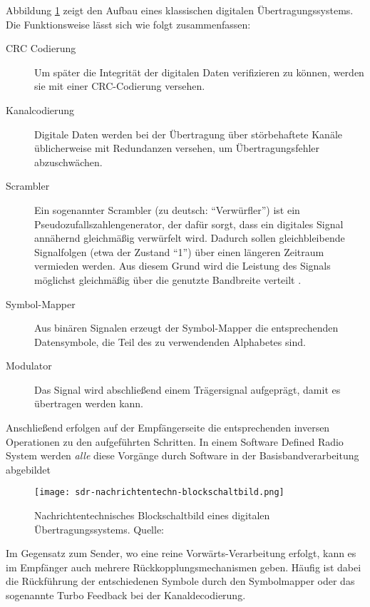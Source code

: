 Abbildung \ref{nachrichtentechn-blockschaltbild} zeigt den Aufbau eines klassischen digitalen Übertragungssystems. Die Funktionsweise lässt sich wie folgt zusammenfassen:
\begin{description}
	\item [CRC Codierung] Um später die Integrität der digitalen Daten verifizieren zu können, werden sie mit einer \ac{CRC}-Codierung versehen.
	\item [Kanalcodierung] Digitale Daten werden bei der Übertragung über störbehaftete Kanäle üblicherweise mit Redundanzen versehen, um Übertragungsfehler abzuschwächen.
	\item [Scrambler] Ein sogenannter Scrambler (zu deutsch: \enquote{Verwürfler}) ist ein Pseudozufallszahlengenerator, der dafür sorgt, dass ein digitales Signal annähernd gleichmäßig verwürfelt wird. Dadurch sollen gleichbleibende Signalfolgen (etwa der Zustand \enquote{1}) über einen längeren Zeitraum vermieden werden. Aus diesem Grund wird die Leistung des Signals möglichst gleichmäßig über die genutzte Bandbreite verteilt \cite[vgl. Heuberger, e. a., S. 75]{Heuberger:2017}.
	\item [Symbol-Mapper] Aus binären Signalen erzeugt der Symbol-Mapper die entsprechenden Datensymbole, die Teil des zu verwendenden Alphabetes sind. 
	\item [Modulator] Das Signal wird abschließend einem Trägersignal aufgeprägt, damit es übertragen werden kann.
\end{description}

Anschließend erfolgen auf der Empfängerseite die entsprechenden inversen Operationen zu den aufgeführten Schritten. In einem Software Defined Radio System werden \textit{alle} diese Vorgänge durch Software in der Basisbandverarbeitung abgebildet \cite[vgl. Heuberger, e. a., S. 38]{Heuberger:2017}

\begin{figure}[ht]
	\centering
	\texttt{[image: sdr-nachrichtentechn-blockschaltbild.png]}
	\caption[Nachrichtentechnisches Blockschaltbild eines digitalen Übertragungssystems]{Nachrichtentechnisches Blockschaltbild eines digitalen Übertragungssystems. Quelle: \cite[Heuberger, e. a., S. 38]{Heuberger:2017}}
	\label{nachrichtentechn-blockschaltbild}
\end{figure}

Im Gegensatz zum Sender, wo eine reine Vorwärts-Verarbeitung erfolgt, kann es im Empfänger auch mehrere Rückkopplungsmechanismen geben. 
Häufig ist dabei die Rückführung der entschiedenen Symbole durch den Symbolmapper oder das sogenannte Turbo Feedback bei der Kanaldecodierung. 



